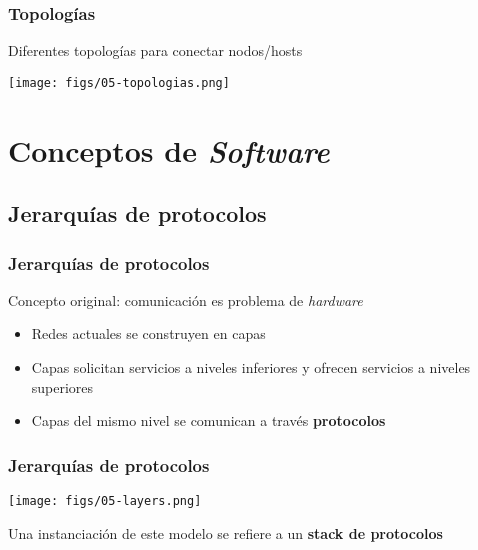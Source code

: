 \documentclass[letter]{beamer}
\begin{document}
\begin{frame}
  \frametitle{Topologías}

  Diferentes topologías para conectar nodos/hosts
  
  \begin{center}
    \texttt{[image: figs/05-topologias.png]}
  \end{center}
  
\end{frame}

\section{Conceptos de {\em Software}}

\subsection{Jerarquías de protocolos}

\begin{frame}
  \frametitle{Jerarquías de protocolos}

  Concepto original: comunicación es problema de {\em hardware}
   
  \begin{itemize}
    \item<3-> Redes actuales se construyen en capas
    \item<3-> Capas solicitan servicios a niveles inferiores y ofrecen servicios a niveles superiores
    \item<3-> Capas del mismo nivel se comunican a través {\bf protocolos}
  \end{itemize}
  
\end{frame}

\begin{frame}
  \frametitle{Jerarquías de protocolos}

  \begin{center}
    \texttt{[image: figs/05-layers.png]}
  \end{center}

  Una instanciación de este modelo se refiere a un {\bf stack de protocolos}
\end{frame}
\end{document}
